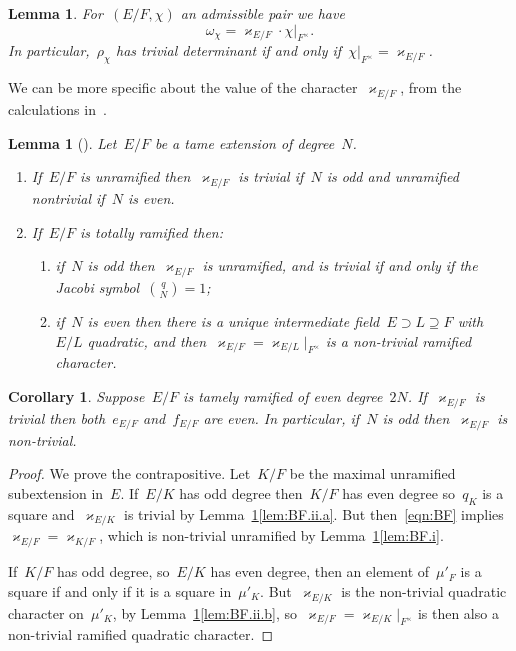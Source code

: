 \documentclass[12pt]{amsart}
\newtheorem{cor}[thm]{Corollary}
\newtheorem{lem}[thm]{Lemma}
\newtheorem{cor}[equation]{Corollary}
\newtheorem{lem}[equation]{Lemma}
\begin{document}
\begin{lem}\label{lem:det}
For~$(E/F,\chi)$ an admissible pair we have
\[
\omega_\chi = \varkappa_{E/F} \cdot \chi|_{F^\times}.
\]
In particular,~$\rho_\chi$ has trivial determinant if and only if~$\chi|_{F^\times}=\varkappa_{E/F}$. 
\end{lem}

We can be more specific about the value of the character~$\varkappa_{E/F}$, from the calculations in~\cite[\S10]{BF83}.

\begin{lem}[{\cite[Propositions~10.1.5,~10.1.6]{BF83}}]\label{lem:BF}
Let~$E/F$ be a tame extension of degree~$N$.
\begin{enumerate}
\item\label{lem:BF.i} If~$E/F$ is unramified then~$\varkappa_{E/F}$ is trivial if~$N$ is odd and unramified nontrivial if~$N$ is even.
\item\label{lem:BF.ii} If~$E/F$ is totally ramified then:
\begin{enumerate}
\item\label{lem:BF.ii.a} if~$N$ is odd then~$\varkappa_{E/F}$ is unramified, and is trivial if and only if the Jacobi symbol~$\binom qN = 1$;
\item\label{lem:BF.ii.b} if~$N$ is even then there is a unique intermediate field~$E\supset L\supseteq F$ with~$E/L$ quadratic, and then~$\varkappa_{E/F}=\varkappa_{E/L}|_{F^\times}$ is a non-trivial ramified character.
\end{enumerate}
\end{enumerate}
\end{lem}

\begin{cor}
Suppose~$E/F$ is tamely ramified of even degree~$2N$. If~$\varkappa_{E/F}$ is trivial then both~$e_{E/F}$ and~$f_{E/F}$ are even. In particular, if~$N$ is odd then~$\varkappa_{E/F}$ is non-trivial.
\end{cor}

\begin{proof}
We prove the contrapositive. Let~$K/F$ be the maximal unramified subextension in~$E$. If~$E/K$ has odd degree then~$K/F$ has even degree so~$q_K$ is a square and~$\varkappa_{E/K}$ is trivial by Lemma~\ref{lem:BF}\ref{lem:BF.ii.a}. But then~\eqref{eqn:BF} implies~$\varkappa_{E/F} = \varkappa_{K/F}$, which is non-trivial unramified by Lemma~\ref{lem:BF}\ref{lem:BF.i}. 

If~$K/F$ has odd degree, so~$E/K$ has even degree, then an element of~$\mu'_F$ is a square if and only if it is a square in~$\mu'_K$. But~$\varkappa_{E/K}$ is the non-trivial quadratic character on~$\mu'_K$, by Lemma~\ref{lem:BF}\ref{lem:BF.ii.b}, so~$\varkappa_{E/F} = \varkappa_{E/K}|_{F^\times}$ is then also a non-trivial ramified quadratic character.
\end{proof}
\end{document}
